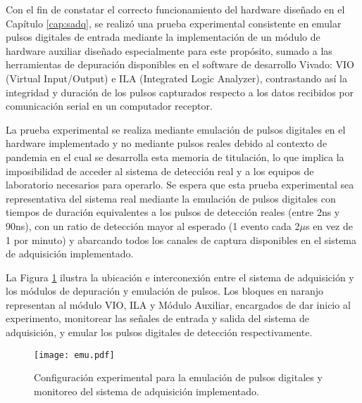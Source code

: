 
Con el fin de constatar  el correcto funcionamiento del hardware diseñado en el Capítulo \ref{cap:sadq}, se realizó una prueba experimental consistente en emular pulsos digitales de entrada mediante la implementación de un módulo de hardware auxiliar diseñado especialmente para este propósito, sumado a las herramientas de depuración disponibles en el software de desarrollo Vivado: VIO (Virtual Input/Output)\cite{XilinxVirtualSuite} e ILA (Integrated Logic Analyzer)\cite{XilinxIntegratedPG172}, contrastando así la integridad y duración de los pulsos capturados respecto a los datos recibidos por comunicación serial en un computador receptor. 

La prueba experimental se realiza mediante emulación de pulsos digitales en el hardware implementado y no mediante pulsos reales debido al contexto de pandemia en el cual se desarrolla esta memoria de titulación, lo que implica la imposibilidad de acceder al sistema de detección real y a los equipos de laboratorio necesarios para operarlo. Se espera que esta prueba experimental sea representativa del sistema real mediante la emulación de pulsos digitales con tiempos de duración equivalentes a los pulsos de detección reales (entre 2ns y 90ns), con un ratio de detección mayor al esperado (1 evento cada 2$\mu$s en vez de 1 por minuto) y abarcando todos los canales de captura disponibles en el sistema de adquisición implementado.

La Figura \ref{fig:emu} ilustra la ubicación e interconexión entre el sistema de adquisición y los módulos de depuración y emulación de pulsos. Los bloques en naranjo representan al módulo VIO, ILA y Módulo Auxiliar, encargados de dar inicio al experimento, monitorear las señales de entrada y salida del sistema de adquisición, y emular los pulsos digitales de detección respectivamente.

\begin{figure}[ht]
	\centering
	\texttt{[image: emu.pdf]}
	\caption{Configuración experimental para la emulación de pulsos digitales y monitoreo del sistema de adquisición implementado.}
	\label{fig:emu}
\end{figure}

